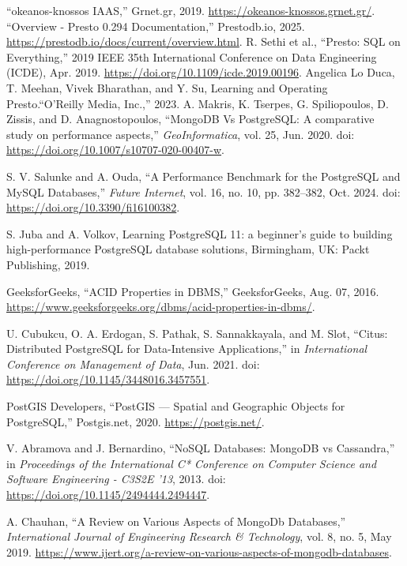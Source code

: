 \documentclass[conference]{IEEEtran}
\begin{document}
\begin{thebibliography}{00}
     ``okeanos-knossos IAAS,'' Grnet.gr, 2019.
    \url{https://okeanos-knossos.grnet.gr/}.
     ``Overview - Presto 0.294 Documentation,'' Prestodb.io, 2025. \href{https://prestodb.io/docs/current/overview.html}{https://prestodb.io/docs/current/overview.html}.
     R. Sethi et al., ``Presto: SQL on Everything,''
    2019 IEEE 35th International Conference on Data Engineering (ICDE), Apr. 2019.
    \url{https://doi.org/10.1109/icde.2019.00196}.
     Angelica Lo Duca, T. Meehan, Vivek Bharathan, and Y. Su, Learning and Operating Presto.``O’Reilly Media, Inc.,'' 2023.
     A. Makris, K. Tserpes, G. Spiliopoulos, D. Zissis, and D. Anagnostopoulos, ``MongoDB Vs PostgreSQL: A comparative study on performance aspects,'' \textit{GeoInformatica}, vol. 25, Jun. 2020. doi: \url{https://doi.org/10.1007/s10707-020-00407-w}.

     S. V. Salunke and A. Ouda, ``A Performance Benchmark for the PostgreSQL and MySQL Databases,'' \textit{Future Internet}, vol. 16, no. 10, pp. 382--382, Oct. 2024. doi: \url{https://doi.org/10.3390/fi16100382}.

     S. Juba and A. Volkov, Learning PostgreSQL 11: a beginner’s guide to building high-performance PostgreSQL database solutions, Birmingham, UK: Packt Publishing, 2019.

     GeeksforGeeks, ``ACID Properties in DBMS,'' GeeksforGeeks, Aug. 07, 2016. \url{https://www.geeksforgeeks.org/dbms/acid-properties-in-dbms/}.

     U. Cubukcu, O. A. Erdogan, S. Pathak, S. Sannakkayala, and M. Slot, ``Citus: Distributed PostgreSQL for Data-Intensive Applications,'' in \textit{International Conference on Management of Data}, Jun. 2021. doi: \url{https://doi.org/10.1145/3448016.3457551}.

     PostGIS Developers, ``PostGIS — Spatial and Geographic Objects for PostgreSQL,'' Postgis.net, 2020. \url{https://postgis.net/}.

     V. Abramova and J. Bernardino, ``NoSQL Databases: MongoDB vs Cassandra,'' in \textit{Proceedings of the International C* Conference on Computer Science and Software Engineering - C3S2E ’13}, 2013. doi: \url{https://doi.org/10.1145/2494444.2494447}.

     A. Chauhan, ``A Review on Various Aspects of MongoDb Databases,'' \textit{International Journal of Engineering Research \& Technology}, vol. 8, no. 5, May 2019. \url{https://www.ijert.org/a-review-on-various-aspects-of-mongodb-databases}.


\end{thebibliography}
\end{document}
